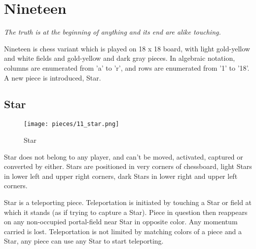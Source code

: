 

\chapter*{Nineteen}

\begin{flushright}
\parbox{0.8\textwidth}{
\emph{The truth is at the beginning of anything and its end are alike touching. \\
 } }
\end{flushright}

\noindent
Nineteen is chess variant which is played on 18 x 18 board, with
light gold-yellow and white fields and gold-yellow and dark gray
pieces. In algebraic notation, columns are enumerated from 'a' to 'r',
and rows are enumerated from '1' to '18'. A new piece is introduced,
Star.

\clearpage %

\section*{Star}

\noindent
\begin{wrapfigure}[11]{l}{0.4\textwidth}
\centering
\texttt{[image: pieces/11\_star.png]}
\caption{Star}
\label{fig:11_star}
\end{wrapfigure}
Star does not belong to any player, and can't be moved, activated, captured or converted by
either. Stars are positioned in very corners of chessboard, light Stars in lower left and
upper right corners, dark Stars in lower right and upper left corners.

Star is a teleporting piece. Teleportation is initiated by touching a Star or field at
which it stands (as if trying to capture a Star). Piece in question then reappears on any
non-occupied portal-field near Star in opposite color. Any momentum carried is lost.
Teleportation is not limited by matching colors of a piece and a Star, any piece can use
any Star to start teleporting.

